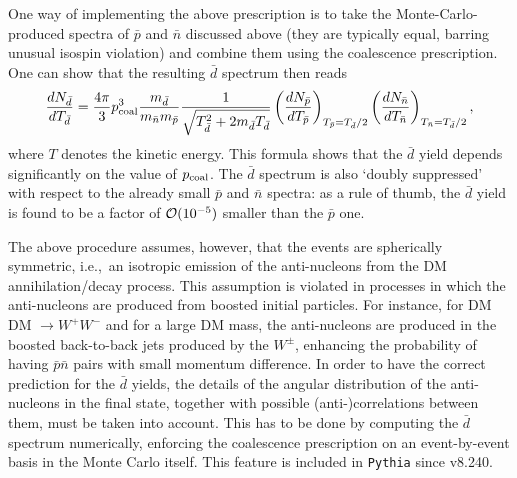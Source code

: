 One way of implementing the above prescription is to take the Monte-Carlo-produced spectra of $\bar p$ and $\bar n$ discussed above (they are typically equal, barring unusual isospin violation) and combine them using the coalescence prescription. One can show that the resulting $\bar{d}$ spectrum then reads
\begin{equation}
 \frac{dN_{\bar{d}}}{dT_{\bar{d}}}=\frac{4\pi}{3}p_{\rm coal}^{3}\frac{m_{\bar{d}}}{m_{\bar{n}}m_{\bar{p}}}\frac{1}{\sqrt{T_{\bar{d}}^{2}+2m_{\bar{d}}T_{\bar{d}}}}\left(\frac{dN_{\bar{p}}}{dT_{\bar{p}}}\right)_{T_{\bar{p}}=T_{\bar{d}}/2}
 \left(\frac{dN_{\bar{n}}}{dT_{\bar{n}}}\right)_{T_{\bar{n}}=T_{\bar{d}}/2},
 \label{eq:antiD}
\end{equation}
where $T$ denotes the kinetic energy. This formula shows 
that the $\bar d$ yield depends significantly on the value of $p_{\rm coal}$. The $\bar d$ spectrum is also  `doubly suppressed' with respect to the already small $\bar p$ and $\bar n$ spectra: as a rule of thumb, the $\bar d$ yield is found to be a factor of ${\cal O}(10^{-5})$ smaller than the $\bar p$ one.

The above procedure assumes, however, that the events are spherically symmetric, i.e.,~an isotropic emission of the anti-nucleons from the DM annihilation/decay process. This assumption is violated in processes in which the anti-nucleons are produced from boosted initial particles. For instance, for DM DM $\to W^+W^-$ and for a large DM mass, the anti-nucleons are produced in the boosted back-to-back jets produced by the $W^\pm$, enhancing the probability of having  $\bar p \bar n$ pairs with small momentum difference. In order to have the correct prediction for the $\bar d$ yields, the details of the angular distribution of the anti-nucleons in the final state, together with possible (anti-)correlations between them, must be taken into account. 
This has to be done by computing the $\bar d$ spectrum numerically, enforcing the coalescence prescription on an event-by-event basis in the Monte Carlo itself. This feature is included in {\tt Pythia} since v8.240.

